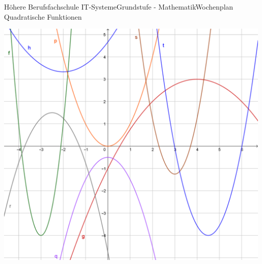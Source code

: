 \documentclass[oneside,openany,headings=optiontotoc,11pt,numbers=noenddot]{scrreprt}
\begin{document}
\begin{worksheet}{Höhere Berufsfachschule IT-Systeme}{Grundstufe - Mathematik}{Wochenplan Quadratische Funktionen}
\begin{framed}
			\includegraphics[width=\textwidth]{../99_Bilder/WP6_T5.png}\\
		\end{framed}
	\end{worksheet}
\end{document}
